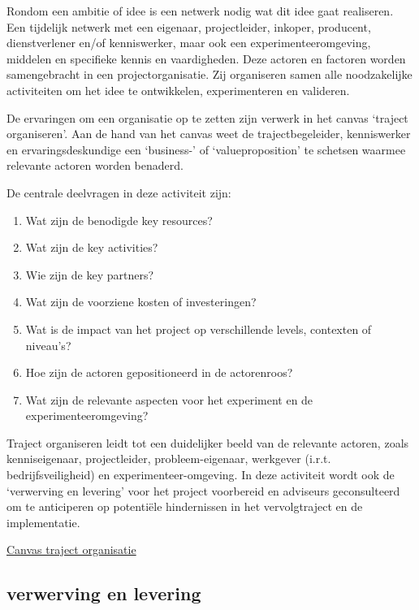 \documentclass[
]{book}
\providecommand{\tightlist}{%
  \setlength{\itemsep}{0pt}\setlength{\parskip}{0pt}}
\begin{document}
Rondom een ambitie of idee is een netwerk nodig wat dit idee gaat realiseren. Een tijdelijk netwerk met een eigenaar, projectleider, inkoper, producent, dienstverlener en/of kenniswerker, maar ook een experimenteeromgeving, middelen en specifieke kennis en vaardigheden. Deze actoren en factoren worden samengebracht in een projectorganisatie. Zij organiseren samen alle noodzakelijke activiteiten om het idee te ontwikkelen, experimenteren en valideren.

De ervaringen om een organisatie op te zetten zijn verwerk in het canvas `traject organiseren'. Aan de hand van het canvas weet de trajectbegeleider, kenniswerker en ervaringsdeskundige een `business-' of `valueproposition' te schetsen waarmee relevante actoren worden benaderd.

De centrale deelvragen in deze activiteit zijn:

\begin{enumerate}
\def\labelenumi{\arabic{enumi}.}
\tightlist
\item
  Wat zijn de benodigde key resources?
\item
  Wat zijn de key activities?
\item
  Wie zijn de key partners?
\item
  Wat zijn de voorziene kosten of investeringen?
\item
  Wat is de impact van het project op verschillende levels, contexten of niveau's?
\item
  Hoe zijn de actoren gepositioneerd in de actorenroos?
\item
  Wat zijn de relevante aspecten voor het experiment en de experimenteeromgeving?
\end{enumerate}

Traject organiseren leidt tot een duidelijker beeld van de relevante actoren, zoals kenniseigenaar, projectleider, probleem-eigenaar, werkgever (i.r.t. bedrijfsveiligheid) en experimenteer-omgeving. In deze activiteit wordt ook de `verwerving en levering' voor het project voorbereid en adviseurs geconsulteerd om te anticiperen op potentiële hindernissen in het vervolgtraject en de implementatie.

\href{data/images/20200116-CDE-canvassen-trajectorganisatie.png}{Canvas traject organisatie}

\hypertarget{verwerving-en-levering}{%
\subsection{verwerving en levering}\label{verwerving-en-levering}}
\end{document}
